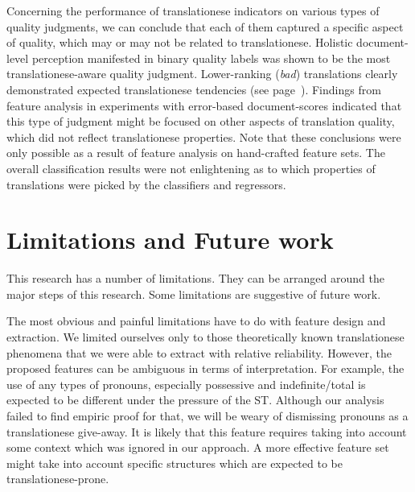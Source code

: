 Concerning the performance of translationese indicators on various types of quality judgments, we can conclude that each of them captured a specific aspect of quality, which may or may not be related to translationese. Holistic document-level perception manifested in binary quality labels was shown to be the most translationese-aware quality judgment.
Lower-ranking (\textit{bad}) translations clearly demonstrated expected translationese tendencies (see page~\pageref{pg:bad_tendencies}).
Findings from feature analysis in experiments with error-based document-scores indicated that this type of judgment might be focused on other aspects of translation quality, which did not reflect translationese properties.
Note that these conclusions were only possible as a result of feature analysis on hand-crafted feature sets. The overall classification results were not enlightening as to which properties of translations were picked by the classifiers and regressors. 


\section{Limitations and Future work}
This research has a number of limitations. They can be arranged around the major steps of this research.
Some limitations are suggestive of future work.
 
The most obvious and painful limitations have to do with feature design and extraction. We limited ourselves only to those theoretically known translationese phenomena that we were able to extract with relative reliability. 
However, the proposed features can be ambiguous in terms of interpretation.
For example, the use of any types of pronouns, especially possessive and indefinite/total is expected to be different under the pressure of the ST. Although our analysis failed to find empiric proof for that, we will be weary of dismissing pronouns as a translationese give-away. It is likely that this feature requires taking into account some context which was ignored in our approach. A more effective feature set might take into account specific structures which are expected to be translationese-prone.

